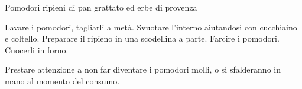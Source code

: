 \begin{recipe}{Pomodori ripieni di pan grattato ed erbe di provenza}
    \begin{header}

    \end{header}
    
    \begin{ingredients}
        
    \end{ingredients}
    
    \begin{preparation}
        \step Lavare i pomodori, tagliarli a metà.
        \step Svuotare l'interno aiutandosi con cucchiaino e coltello.
        \step Preparare il ripieno in una scodellina a parte.
        \step Farcire i pomodori.
        \step Cuocerli in forno.
    \end{preparation}
    
    \begin{suggestion}
        \suggestionMark Prestare attenzione a non far diventare i pomodori molli, o si sfalderanno in mano al momento del consumo.
    \end{suggestion}
\end{recipe}
